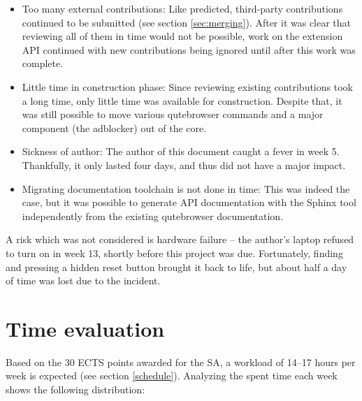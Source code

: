 \begin{itemize}
  \item Too many external contributions: Like predicted, third-party
    contributions continued to be submitted (see section \ref{sec:merging}).
    After it was clear that reviewing all of them in time would not be possible,
    work on the extension API continued with new contributions being ignored
    until after this work was complete.
  \item Little time in construction phase: Since reviewing existing
    contributions took a long time, only little time was available for
    construction. Despite that, it was still possible to move various
    qutebrowser commands and a major component (the adblocker) out of the core.
  \item Sickness of author: The author of this document caught a fever in week
    5. Thankfully, it only lasted four days, and thus did not have a major
    impact.
  \item Migrating documentation toolchain is not done in time: This was indeed
    the case, but it was possible to generate API documentation with the Sphinx
    tool independently from the existing qutebrowser documentation.
\end{itemize}

A risk which was not considered is hardware failure -- the author's laptop
refused to turn on in week 13, shortly before this project was due. Fortunately,
finding and pressing a hidden reset button brought it back to life, but about
half a day of time was lost due to the incident.

\section{Time evaluation}
Based on the 30 ECTS points awarded for the SA, a workload of 14--17
hours per week is expected (see section \ref{schedule}). Analyzing the
spent time each week shows the following distribution:

